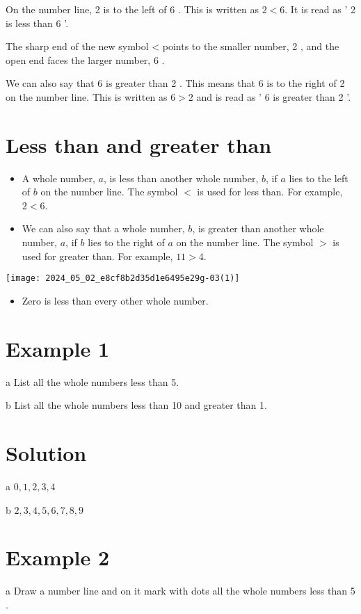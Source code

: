 \documentclass[10pt]{article}
\begin{document}
On the number line, 2 is to the left of 6 . This is written as \(2<6\). It is read as ' 2 is less than 6 '.

The sharp end of the new symbol < points to the smaller number, 2 , and the open end faces the larger number, 6 .

We can also say that 6 is greater than 2 . This means that 6 is to the right of 2 on the number line. This is written as \(6>2\) and is read as ' 6 is greater than 2 '.

\section*{Less than and greater than}
\begin{itemize}
  \item A whole number, \(a\), is less than another whole number, \(b\), if \(a\) lies to the left of \(b\) on the number line. The symbol \(<\) is used for less than. For example, \(2<6\).
  \item We can also say that a whole number, \(b\), is greater than another whole number, \(a\), if \(b\) lies to the right of \(a\) on the number line. The symbol \(>\) is used for greater than. For example, \(11>4\).
\end{itemize}

\begin{center}
\texttt{[image: 2024\_05\_02\_e8cf8b2d35d1e6495e29g-03(1)]}
\end{center}

\begin{itemize}
  \item Zero is less than every other whole number.
\end{itemize}

\section*{Example 1}
a List all the whole numbers less than 5.

b List all the whole numbers less than 10 and greater than 1.

\section*{Solution}
a \(0,1,2,3,4\)

b \(2,3,4,5,6,7,8,9\)

\section*{Example 2}
a Draw a number line and on it mark with dots all the whole numbers less than 5 .
\end{document}

